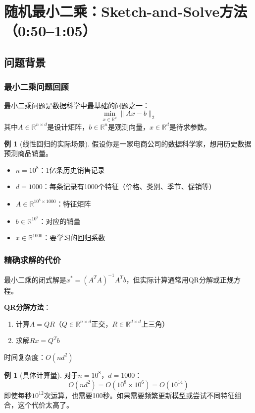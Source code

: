 \documentclass[11pt,a4paper]{ctexart}
\theoremstyle{definition}
\newtheorem{example}[theorem]{例}
\theoremstyle{remark}
\begin{document}
\section{随机最小二乘：Sketch-and-Solve方法（0:50--1:05）}

\subsection{问题背景}

\subsubsection{最小二乘问题回顾}

最小二乘问题是数据科学中最基础的问题之一：
\[
\min_{x \in \mathbb{R}^d} \|Ax - b\|_2
\]
其中$A \in \mathbb{R}^{n \times d}$是设计矩阵，$b \in \mathbb{R}^n$是观测向量，$x \in \mathbb{R}^d$是待求参数。

\begin{example}[线性回归的实际场景]
假设你是一家电商公司的数据科学家，想用历史数据预测商品销量。
\begin{itemize}
    \item $n = 10^8$：1亿条历史销售记录
    \item $d = 1000$：每条记录有1000个特征（价格、类别、季节、促销等）
    \item $A \in \mathbb{R}^{10^8 \times 1000}$：特征矩阵
    \item $b \in \mathbb{R}^{10^8}$：对应的销量
    \item $x \in \mathbb{R}^{1000}$：要学习的回归系数
\end{itemize}
\end{example}

\subsubsection{精确求解的代价}

最小二乘的闭式解是$x^* = (A^T A)^{-1} A^T b$，但实际计算通常用QR分解或正规方程。

\textbf{QR分解方法}：
\begin{enumerate}
    \item 计算$A = QR$（$Q \in \mathbb{R}^{n \times d}$正交，$R \in \mathbb{R}^{d \times d}$上三角）
    \item 求解$Rx = Q^T b$
\end{enumerate}
时间复杂度：$O(nd^2)$

\begin{example}[具体计算量]
对于$n = 10^8$，$d = 1000$：
\[
O(nd^2) = O(10^8 \times 10^6) = O(10^{14})
\]
即使每秒$10^{12}$次运算，也需要100秒。如果需要频繁更新模型或尝试不同特征组合，这个代价太高了。
\end{example}
\end{document}
